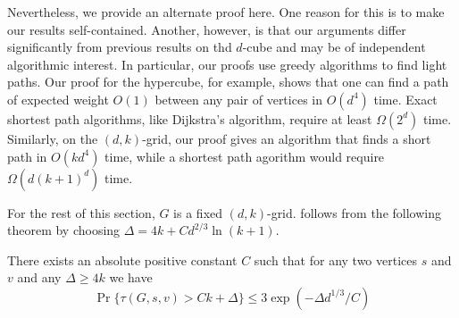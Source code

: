 \documentclass{patmorin}
\begin{document}
Nevertheless, we provide an alternate proof here.  One reason for
this is to make our results self-contained.  Another, however, is
that our arguments differ significantly from previous results on
thd $d$-cube \cite{fill.pemantle:percolation, martinsson:unoriented,
bollobas.kohayakawa:on} and may be of independent algorithmic interest.
In particular, our proofs use greedy algorithms to find light paths.
Our proof for the hypercube, for example, shows that one can find a path
of expected weight $O(1)$ between any pair of vertices in $O(d^4)$ time.
Exact shortest path algorithms, like Dijkstra's algorithm, require at
least $\Omega(2^d)$ time.  Similarly, on the $(d,k)$-grid, our proof
gives an algorithm that finds a short path in $O(kd^4)$ time, while a
shortest path agorithm would require $\Omega(d(k+1)^d)$ time.

For the rest of this section, $G$ is a fixed $(d,k)$-grid.
 follows from the following theorem by choosing $\Delta =
4k+ Cd^{2/3}\ln(k+1)$.

\begin{thm}
  There exists an absolute positive constant $C$ such that for any two
  vertices $s$  and $v$ and any $\Delta\geq 4k$ we have
  \begin{equation}
  \Pr \{ \tau(G,s,v) > Ck + \Delta\} 
        \leq 3 \exp\left(-{\Delta d^{1/3}}/C\right)
  \label{hypercube:formula}
  \end{equation}
\end{thm}

\end{document}
